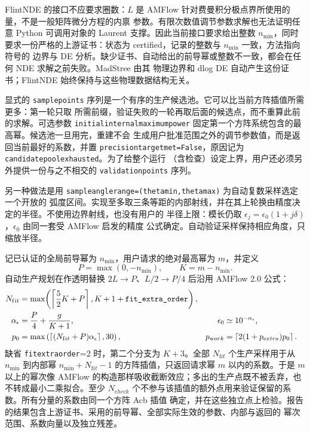 \documentclass[11pt,a4paper]{ctexart}
\newcommand{\eps}{\epsilon}
\renewcommand{\_}{\origunderscore\allowbreak}
\begin{document}
FlintNDE 的接口不应要求圈数：$L$ 是 AMFlow 针对费曼积分极点界所使用的量，不是一般矩阵微分方程的内禀
参数。有限次数值调节参数求解也无法证明任意 Python 可调用对象的 Laurent 支撑。因此当前接口要求给出整数
$n_{\min}$，同时要求一份严格的上游证书：状态为 certified，记录的整数与 $n_{\min}$ 一致，方法指向符号的
边界与 DE 分析。缺少证书、自动给出的前导幂或整数不一致，都会在任何 NDE 求解之前失败。MadStree 由其
物理边界和 dlog DE 自动产生这份证书；FlintNDE 始终保持与这些物理数据结构无关。

显式的 \texttt{sample\_points} 序列是一个有序的生产候选池。它可以比当前方阵插值所需更多：第一轮只取
所需前缀，验证失败的一轮再取后面的候选点，而不重算此前的求解。可选参数
\texttt{initial\_internal\_maximum\_power} 固定第一个方阵系统包含的最高幂。候选池一旦用完，重建不会
生成用户批准范围之外的调节参数值，而是返回当前最好的系数，并置
\texttt{precision\_target\_met=False}，原因记为 \texttt{candidate\_pool\_exhausted}。为了给整个运行
（含检查）设定上界，用户还必须另外提供一份与之不相交的 \texttt{validation\_points} 序列。

另一种做法是用 \texttt{sample\_angle\_range=(theta\_min,theta\_max)} 为自动复数采样选定一个开放的
弧度区间。实现至多取三条等距的内部射线，并在其上轮换由精度决定的半径。不使用边界射线，也没有用户的
半径上限：模长仍取 $\epsilon_j=\epsilon_0(1+j\delta)$，$\epsilon_0$ 由同一套受 AMFlow 启发的精度
公式确定。自动验证采样保持相应角度，只缩放半径。

记已认证的全局前导幂为 $n_{\min}$，用户请求的绝对最高幂为 $m$，并定义
\begin{equation}
  P=\max(0,-n_{\min}),\qquad K=m-n_{\min}.
\end{equation}
自动生产规划在作透明替换 $2L\to P$、$L/2\to P/4$ 后沿用 AMFlow 2.0 公式：
\begin{align}
 N_{\mathrm fit}&=
 \max\!\left(\left\lceil\frac52K+P\right\rceil,K+1+\texttt{fit\_extra\_order}\right),\\
 \alpha_\eps&=\frac P4+\frac{g}{K+1},
 &\eps_0&\simeq10^{-\alpha_\eps},\\
 p_0&=\max\left(\left\lceil(N_{\mathrm fit}+P)\alpha_\eps\right\rceil,30\right),
 &p_{\mathrm work}&=\left\lceil2(1+p_{\mathrm extra})p_0\right\rceil.
  \label{eq:ndes-series-reconstruction-default}
\end{align}
缺省 \texttt{fit\_extra\_order}=2 时，第二个分支为 $K+3$。全部 $N_{\mathrm fit}$ 个生产采样用于从
$n_{\min}$ 到内部幂 $n_{\min}+N_{\mathrm fit}-1$ 的方阵插值，只返回请求幂 $m$ 以内的系数。于是 $m$
以上的幂次像 AMFlow 的构造那样吸收截断效应；多出的生产点既不被丢弃，也不转成最小二乘拟合。至少
$N_{\mathrm check}$ 个不参与该插值的额外点用来验证保留的系数。所有分量的系数由同一个方阵 Acb 插值
确定，并在这些独立点上检验。报告的结果包含上游证书、采用的前导幂、全部实际生效的参数、内部与返回的
幂次范围、系数向量以及独立残差。
\end{document}
